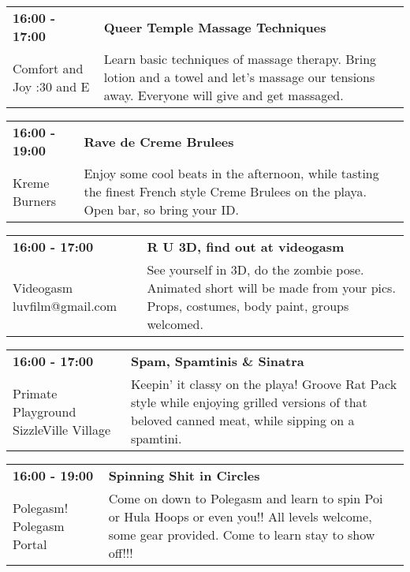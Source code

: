 \begin{tabular}{ p{1in} p{2.2in} }
    \textbf{16:00 - 17:00} & \textbf{Queer Temple Massage Techniques} \\
    Comfort and Joy \newline 7:30 and E & Learn basic techniques of massage therapy.  Bring lotion and a towel and let's massage our tensions away. Everyone will give and get massaged. \\
    \hline 
\end{tabular}
    
\begin{tabular}{ p{1in} p{2.2in} }
    \textbf{16:00 - 19:00} & \textbf{Rave de Creme Brulees} \\
    Kreme Burners \newline  & Enjoy some cool beats in the afternoon, while tasting the finest French style Creme Brulees on the playa. Open bar, so bring your ID. \\
    \hline 
\end{tabular}
    
\begin{tabular}{ p{1in} p{2.2in} }
    \textbf{16:00 - 17:00} & \textbf{R U 3D, find out at videogasm} \\
    Videogasm \newline luvfilm@gmail.com & See yourself in 3D, do the zombie pose. Animated short will be made from your pics. Props, costumes, body paint, groups  welcomed. \\
    \hline 
\end{tabular}
    
\begin{tabular}{ p{1in} p{2.2in} }
    \textbf{16:00 - 17:00} & \textbf{Spam, Spamtinis \& Sinatra} \\
    Primate Playground \newline SizzleVille Village & Keepin' it classy on the playa! Groove Rat Pack style while enjoying grilled versions of that beloved canned meat, while sipping on a spamtini. \\
    \hline 
\end{tabular}
    
\begin{tabular}{ p{1in} p{2.2in} }
    \textbf{16:00 - 19:00} & \textbf{Spinning Shit in Circles} \\
    Polegasm! \newline Polegasm Portal & Come on down to Polegasm and learn to spin Poi or Hula Hoops or even you!! All levels welcome, some gear provided. Come to learn stay to show off!!! \\
    \hline 
\end{tabular}
    
